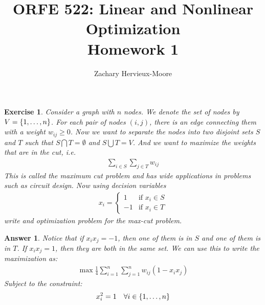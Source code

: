 \documentclass[12pt]{article}
\title{ORFE 522: Linear and Nonlinear Optimization \\ Homework 1}
\author{Zachary Hervieux-Moore}
\date{\displaydate{date}}
\theoremstyle{colon}
\newtheorem{exercise}{Exercise}
\newtheorem*{answer}{Answer}
\begin{document}
\maketitle

\clearpage

\begin{exercise}
  Consider a graph with $n$ nodes. We denote the set of nodes by $V = \{1,\mathellipsis,n\}$. For each pair of nodes $(i,j)$, there is an edge connecting them with a weight $w_{ij} \geq 0$. Now we want to separate the nodes into two disjoint sets $S$ and $T$ such that $S \bigcap T = \emptyset$ and $S \bigcup T = V$. And we want to maximize the weights that are in the cut, i.e.
  \begin{gather*}
    \sum\limits_{i \in S}\sum\limits_{j \in T} w_{ij}
  \end{gather*}
  This is called the \textit{maximum cut problem} and has wide applications in problems such as circuit design. Now using decision variables
  \begin{gather*}
  x_i = \begin{cases}
      1 & \text{if } x_i \in S \\
      -1 & \text{if } x_i \in T
  \end{cases}
  \end{gather*}
  write and optimization problem for the max-cut problem.
\end{exercise}

\begin{answer}
  Notice that if $x_i x_j = -1$, then one of them is in $S$ and one of them is in $T$. If $x_i x_j = 1$, then they are both in the same set. We can use this to write the maximization as:
  \begin{gather*}
    \max \frac{1}{4} \sum\limits_{i = 1}^n \sum\limits_{j = 1}^n w_{ij}(1-x_i x_j)
  \end{gather*}
  Subject to the constraint:
  \begin{gather*}
    x_i^2 = 1 \quad \forall i \in \{1,\mathellipsis, n\}
  \end{gather*}
\end{answer}

\clearpage
\end{document}
